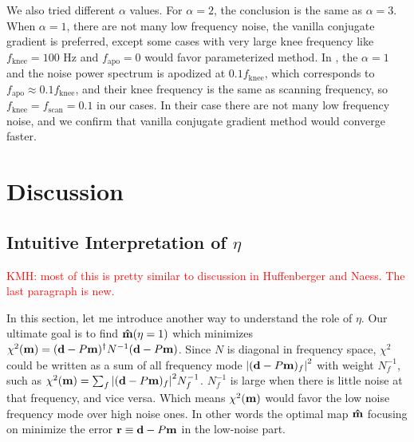 \documentclass[twocolumn,linenumbers]{aastex631}
\newcommand{\vbd}{\vb{d}}
\newcommand{\vbm}{\vb{m}}
\newcommand{\inv}[1]{#1^{-1}}
\newcommand{\hatm}{\vb{\hat{m}}}
\newcommand{\kmh}[1]{\textcolor{red}{KMH: #1}}
\begin{document}
We also tried different $\alpha$ values. For $\alpha=2$, the conclusion is the
same as $\alpha=3$. When $\alpha=1$, there are not many low frequency noise, 
the vanilla conjugate gradient is preferred, except some cases with very large
knee frequency like $f_\text{knee} = 100$ Hz and $f_\text{apo}=0$ would favor
parameterized method.
In \citealt{2018A&A...620A..59P}, the $\alpha = 1$ and  the noise power spectrum is apodized at $0.1f_\text{knee}$,
which corresponds to $f_\text{apo} \approx 0.1 f_\text{knee}$,
and their knee frequency is the same as scanning frequency, so $f_\text{knee}=f_\text{scan}=0.1$ 
in our cases.
In their case there are not many low frequency noise,
and we confirm that vanilla conjugate gradient method would converge faster.



\section{Discussion} \label{sec:discussion}

\subsection{Intuitive Interpretation of $\eta$}\label{intuitive interp}

\kmh{most of this is pretty similar to discussion in Huffenberger and Naess.  The last paragraph is new.}

In this section, let me introduce another way to understand the role of $\eta$.
Our ultimate goal is to find $\hatm(\eta=1)$ which minimizes 
$\chi^2(\vbm) = (\vbd - P\vbm)^{\dagger} \inv{N} (\vbd - P\vbm)$.
Since $N$ is diagonal in frequency space,
$\chi^2$ could be written as a sum of all frequency mode 
$\qty|(\vbd-P\vbm)_f|^2$ with weight $\inv{N}_f$, such as
$\chi^2(\vbm) = \sum_f \qty|(\vbd-P\vbm)_f|^2 \inv{N}_f$.
$\inv{N}_f$ is large when there is little noise at that frequency,
and vice versa.
Which means $\chi^2(\vbm)$ would favor the low noise frequency mode over high 
noise ones.
In other words the optimal map $\hatm$ focusing on minimize the error
$\vb{r} \equiv \vbd - P\vbm$ in the low-noise part.
\end{document}
